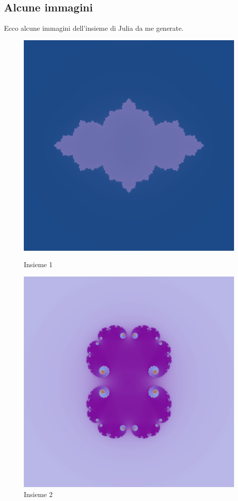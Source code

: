 \documentclass[10pt]{report}
\begin{document}
			\subsection{Alcune immagini}
				Ecco alcune immagini dell'insieme di Julia da me generate.
				\begin{figure}[H]
					\centering
					\includegraphics[width=0.5\linewidth]{"Insieme di Julia/julia1"}
					\caption*{ \footnotesize{Insieme 1} }
					\label{fig:julia1}
					\endminipage \hfill
					\centering
					\includegraphics[width=0.5\linewidth]{"Insieme di Julia/julia2"}
					\caption*{ \footnotesize{Insieme 2} }
					\label{fig:julia2}
					\endminipage \hfill
				\end{figure}
\end{document}
